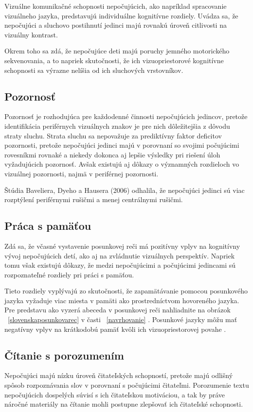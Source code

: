 \documentclass[10pt,oneside,slovak,a4paper]{article}
\begin{document}
Vizuálne komunikačné schopnosti nepočujúcich, ako napríklad spracovanie vizuálneho jazyka, predstavujú individuálne kognitívne rozdiely. Uvádza sa, že nepočujúci a sluchovo postihnutí jedinci majú rovnakú úroveň citlivosti na vizuálny kontrast.

Okrem toho sa zdá, že nepočujúce deti majú poruchy jemného motorického sekvenovania, a to napriek skutočnosti, že ich vizuopriestorové kognitívne schopnosti sa výrazne nelíšia od ich sluchových vrstovníkov\cite{pappas2018learning}.


\subsection{Pozornosť} \label{rozdiely:pozornost}
Pozornosť je rozhodujúca pre každodenné činnosti nepočujúcich jedincov, pretože identifikácia periférnych vizuálnych znakov je pre nich dôležitejšia z dôvodu straty sluchu. Strata sluchu sa nepovažuje za prediktívny faktor deficitov pozornosti, pretože nepočujúci jedinci majú v porovnaní so svojimi počujúcimi rovesníkmi rovnaké a niekedy dokonca aj lepšie výsledky pri riešení úloh vyžadujúcich pozornosť. Avšak existujú aj dôkazy o významných rozdieloch vo vizuálnej pozornosti, najmä v periférnej pozornosti\cite{pappas2018learning}.

Štúdia Baveliera, Dyeho a Hausera (2006) odhalila, že nepočujúci jedinci sú viac rozptýlení periférnymi rušičmi a menej centrálnymi rušičmi. \cite{bavelier2006deaf} 

\subsection{Práca s pamäťou} \label{rozdiely:pamat}
Zdá sa, že včasné vystavenie posunkovej reči má pozitívny vplyv na kognitívny vývoj nepočujúcich detí, ako aj na zvládnutie vizuálnych perspektív. Napriek tomu však existujú dôkazy, že medzi nepočujúcimi a počujúcimi jedincami sú rozpoznateľné rozdiely pri práci s pamäťou.

Tieto rozdiely vyplývajú zo skutočnosti, že zapamätávanie pomocou posunkového jazyka vyžaduje viac miesta v pamäti ako prostredníctvom hovoreného jazyka. Pre predstavu ako vyzerá abeceda v posunkovej reči nahliadnite na obrázok ~\ref{slovenskaposunkovarec} v časti ~\ref{navrhovanie} . Posunkové jazyky môžu mať negatívny vplyv na krátkodobú pamäť kvôli ich vizuopriestorovej povahe
\cite{pappas2018learning}.

\subsection{Čítanie s porozumením} \label{rozdiely:citanie}
Nepočujúci majú nízku úroveň čitateľských schopností, pretože majú odlišný spôsob rozpoznávania slov v porovnaní s počujúcimi čitateľmi. Porozumenie textu nepočujúcich dospelých súvisí s ich čitateľskou motiváciou, a tak by práve náročné materiály na čítanie mohli postupne zlepšovať ich čitateľské schopnosti\cite{pappas2018learning}.
\end{document}
